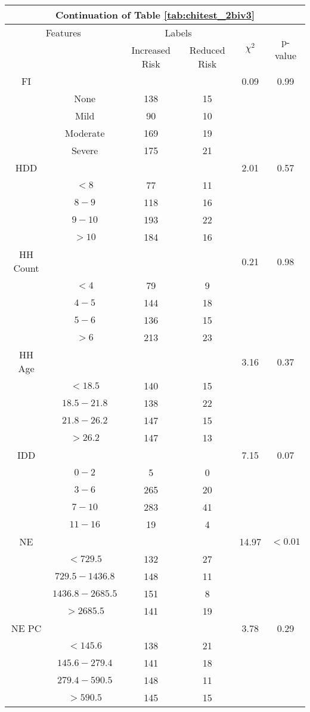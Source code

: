 \begin{table}
\centering
\label{tab:chitest_2biv3_cont}
\begin{tabular}{c c | c c| c | c}
\hline
\multicolumn{6}{c}{Continuation of Table \ref{tab:chitest_2biv3}}\\ 
\hline
\multicolumn{2}{c|}{Features}& \multicolumn{2}{c|}{Labels}& \multirow{2}{*}{$\chi^2$} & \multirow{2}{*}{p-value}\\ 
& & Increased Risk & Reduced Risk & & \\ 
\hline
FI &  &  & & 0.09 & 0.99 \\ 
& None & 138 & 15& & \\ 
& Mild & 90 & 10& & \\ 
& Moderate & 169 & 19& & \\ 
& Severe & 175 & 21& & \\ 
\hline 
HDD &  &  & & 2.01 & 0.57 \\ 
& $< 8$ & 77 & 11& & \\ 
& $8-9$ & 118 & 16& & \\ 
& $9-10$ & 193 & 22& & \\ 
& $> 10$ & 184 & 16& & \\ 
\hline 
HH Count &  &  & & 0.21 & 0.98 \\ 
& $< 4$ & 79 & 9& & \\ 
& $4-5$ & 144 & 18& & \\ 
& $5-6$ & 136 & 15& & \\ 
& $> 6$ & 213 & 23& & \\ 
\hline 
HH Age &  &  & & 3.16 & 0.37 \\ 
& $< 18.5$ & 140 & 15& & \\ 
& $18.5-21.8$ & 138 & 22& & \\ 
& $21.8-26.2$ & 147 & 15& & \\ 
& $> 26.2$ & 147 & 13& & \\ 
\hline 
IDD &  &  & & 7.15 & 0.07 \\ 
& $0-2$ & 5 & 0& & \\ 
& $3-6$ & 265 & 20& & \\ 
& $7-10$ & 283 & 41& & \\ 
& $11-16$ & 19 & 4& & \\ 
\hline 
NE &  &  & & 14.97 & $< 0.01$ \\ 
& $< 729.5$ & 132 & 27& & \\ 
& $729.5-1436.8$ & 148 & 11& & \\ 
& $1436.8-2685.5$ & 151 & 8& & \\ 
& $> 2685.5$ & 141 & 19& & \\ 
\hline 
NE PC &  &  & & 3.78 & 0.29 \\ 
& $< 145.6$ & 138 & 21& & \\ 
& $145.6-279.4$ & 141 & 18& & \\ 
& $279.4-590.5$ & 148 & 11& & \\ 
& $> 590.5$ & 145 & 15& & \\ 
\hline 
\end{tabular}
\end{table}

